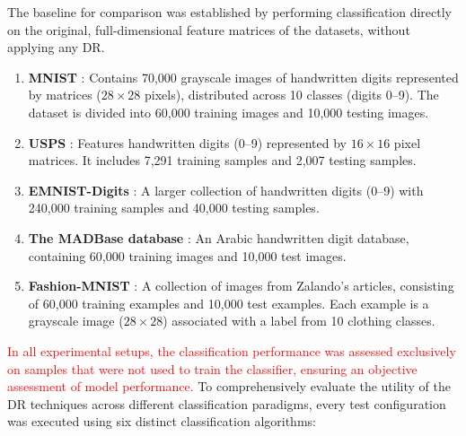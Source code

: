 \documentclass[a4paper,fleqn]{cas-dc}
\begin{document}
The baseline for comparison was established by performing classification directly on the original, full-dimensional feature matrices of the datasets, without applying any DR.


\begin{enumerate}
    \item \textbf{MNIST} \cite{mnist}: Contains 70,000 grayscale images of handwritten digits represented by matrices ($28\times28$ pixels), distributed across 10 classes (digits 0--9). The dataset is divided into 60,000 training images and 10,000 testing images.
    \item \textbf{USPS} \cite{usps}: Features handwritten digits (0--9) represented by $16\times16$ pixel matrices. It includes 7,291 training samples and 2,007 testing samples.
    \item \textbf{EMNIST-Digits} \cite{emnist}: A larger collection of handwritten digits (0--9) with 240,000 training samples and 40,000 testing samples.
    \item \textbf{The MADBase database} \cite{arabic}: An Arabic handwritten digit database, containing 60,000 training images and 10,000 test images.
    \item \textbf{Fashion-MNIST} \cite{fashionmnist}: A collection of images from Zalando's articles, consisting of 60,000 training examples and 10,000 test examples. Each example is a grayscale image ($28\times28$) associated with a label from 10 clothing classes.
\end{enumerate}

\textcolor{red}{In all experimental setups, the classification performance was assessed exclusively on samples that were not used to train the classifier, ensuring an objective assessment of model performance.} To comprehensively evaluate the utility of the DR techniques across different classification paradigms, every test configuration was executed using six distinct classification algorithms:
\end{document}
